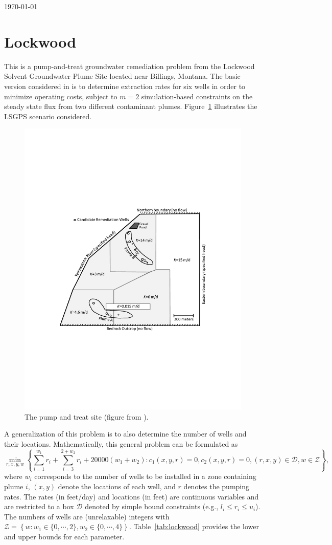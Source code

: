 \documentclass[11pt]{article}
\begin{document}
\today

\section{Lockwood}
\label{sec:lockwood}
This is a pump-and-treat groundwater remediation problem from the Lockwood Solvent Groundwater Plume Site located near Billings, Montana.  The basic version considered in \cite{Matott2011} is to determine extraction rates for six wells in order to minimize operating costs, subject to $m=2$ simulation-based constraints on the steady state flux from two different contaminant plumes. Figure~\ref{fig:site} illustrates the LSGPS scenario considered.

\begin{figure}[tb]
\begin{center}
\includegraphics[width=.6\linewidth]{images/Lockwood_Site.pdf}
\end{center}
\caption{The pump and treat site (figure from \cite{Matott2011}).\label{fig:site}}
\end{figure}

A generalization of this problem is to also determine the number of wells and their locations. Mathematically, this general problem can be formulated as
\begin{equation}
\min_{r,x,y,w} \left\{\sum_{i=1}^{w_1} r_i + \sum_{i=3}^{2+w_2} r_i+ 20000(w_1+w_2) : 
 c_1(x,y,r)=0, 
 c_2(x,y,r)=0,
 (r,x,y)\in\mathcal{D}, 
 w \in \mathcal{Z}
 \right\},
 \label{eq:lockwood}
\end{equation}
where $w_i$ corresponds to the number of wells to be installed in a zone containing plume $i$, $(x,y)$ denote the locations of each well, and $r$ denotes the pumping rates. The rates (in feet/day) and locations (in feet) are continuous variables and are restricted to a box $\mathcal{D}$ denoted by simple bound constraints (e.g., $l_i\leq r_i \leq u_i$). The numbers of wells are (unrelaxable) integers with $\mathcal{Z}=\left\{w:w_1\in\{0,\cdots,2\},w_2\in\{0,\cdots,4\}\right\}$.  Table~\ref{tab:lockwood} provides the lower and upper bounds for each parameter. 
\end{document}
